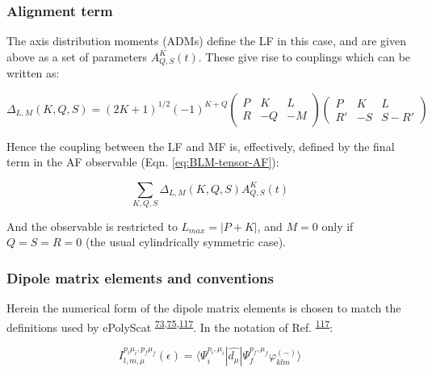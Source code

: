 \documentclass[10pt]{article}
\begin{document}
\subsubsection{Alignment term\label{alignment-term}}

The axis distribution moments (ADMs) define the LF in this case, and are given above as a set of parameters $A_{Q,S}^{K}(t)$. These give rise to couplings which can be written as:

\begin{equation}
\Delta_{L,M}(K,Q,S)=(2K+1)^{1/2}(-1)^{K+Q}\left(\begin{array}{ccc}
P & K & L\\
R & -Q & -M
\end{array}\right)\left(\begin{array}{ccc}
P & K & L\\
R' & -S & S-R'
\end{array}\right)
\label{eq:delta-func-defn}
\end{equation}

Hence the coupling between the LF and MF is, effectively, defined by the final term in the AF observable (Eqn. \ref{eq:BLM-tensor-AF}):

\begin{equation}
\sum_{K,Q,S}\Delta_{L,M}(K,Q,S)A_{Q,S}^{K}(t)
\end{equation}

And the observable is restricted to $L_{max}=|P+K|$, and $M=0$ only if  $Q=S=R=0$ (the usual cylindrically symmetric case).

\subsubsection{Dipole matrix elements and conventions\label{sec:mat-ele-conventions}}


Herein the numerical form of the dipole matrix elements is chosen to match the definitions used by ePolyScat \textsuperscript{\hyperref[csl:73]{73},\hyperref[csl:75]{75},\hyperref[csl:117]{117}}. In the notation of Ref. \textsuperscript{\hyperref[csl:117]{117}}:

\begin{equation}
I_{l,m,\mu}^{p_{i}\mu_{i},p_{f}\mu_{f}}(\epsilon)=\langle\Psi_{i}^{p_{i},\mu_{i}}|\hat{d_{\mu}}|\Psi_{f}^{p_{f},\mu_{f}}\varphi_{klm}^{(-)}\rangle\label{eq:eps-I}
\end{equation}
\end{document}

